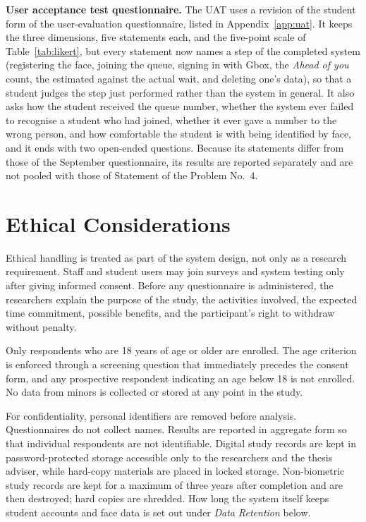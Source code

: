 \documentclass{research}
\begin{document}
\textbf{User acceptance test questionnaire.} The UAT uses a revision of
the student form of the user-evaluation questionnaire, listed in
Appendix~\ref{app:uat}. It keeps the three dimensions, five statements
each, and the five-point scale of Table~\ref{tab:likert}, but every
statement now names a step of the completed system (registering the
face, joining the queue, signing in with Gbox, the \emph{Ahead of you}
count, the estimated against the actual wait, and deleting one's data),
so that a student judges the step just performed rather than the
system in general. It also asks how the student received the queue
number, whether the system ever failed to recognise a student who had
joined, whether it ever gave a number to the wrong person, and how
comfortable the student is with being identified by face, and it ends
with two open-ended questions. Because its statements differ from those
of the September questionnaire, its results are reported separately and
are not pooled with those of Statement of the Problem No.~4.

\section{Ethical Considerations}
\label{sec:ethics}

Ethical handling is treated as part of the system design, not only as a
research requirement. Staff and student users may join
surveys and system testing only after giving informed consent. Before
any questionnaire is administered, the researchers explain the purpose of the study, the activities involved,
the expected time commitment, possible benefits, and the participant's
right to withdraw without penalty.

Only respondents who are 18 years of age or older are enrolled. The
age criterion is enforced through a screening question that immediately
precedes the consent form, and any prospective respondent indicating an
age below 18 is not enrolled. No data from minors is collected or
stored at any point in the study.

For confidentiality, personal identifiers are removed before analysis.
Questionnaires do not collect names. Results are reported in aggregate
form so that individual respondents are not identifiable. Digital study
records are kept in password-protected storage accessible only to the
researchers and the thesis adviser, while hard-copy materials are placed
in locked storage. Non-biometric study records are kept for a maximum
of three years after completion and are then destroyed; hard copies are
shredded. How long the system itself keeps student accounts and face
data is set out under \emph{Data Retention} below.
\end{document}
